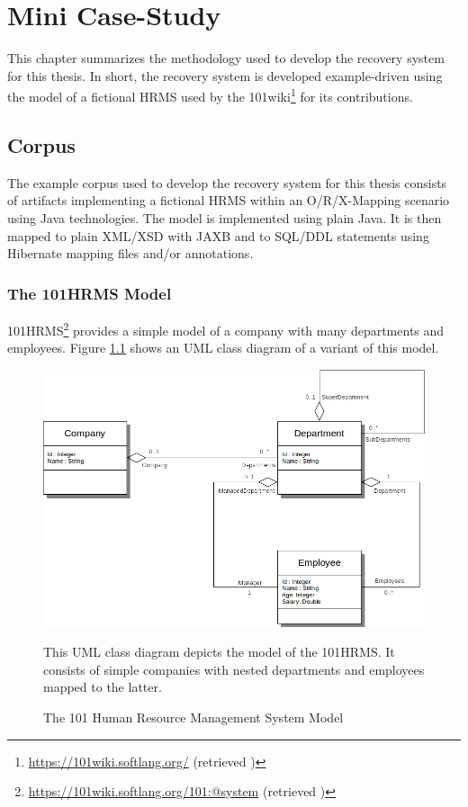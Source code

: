 \chapter{Mini Case-Study}
\label{chapter:MiniCaseStudy}
This chapter summarizes the methodology used to develop the recovery system for this thesis.
In short, the recovery system is developed example-driven using the model of a fictional \gls{HRMS} used by the 101wiki\footnote{\url{https://101wiki.softlang.org/} (retrieved )} for its contributions.

\section{Corpus}
\label{section:ExampleCorpus}
The example corpus used to develop the recovery system for this thesis consists of artifacts implementing a fictional \gls{HRMS} within an \gls{O/R/X-Mapping} scenario using \gls{Java} technologies.
The model is implemented using plain \Gls{Java}. 
It is then mapped to plain \gls{XML}/\gls{XSD} with \gls{JAXB} and to \gls{SQL/DDL} statements using \gls{Hibernate} mapping files and/or annotations.



\subsection{The 101HRMS Model}
\gls{101HRMS}\footnote{\url{https://101wiki.softlang.org/101:@system} (retrieved )} provides a simple model of a company with many departments and employees.
Figure \ref{figure:101HRMSModel} shows an \gls{UML} class diagram of a variant of this model.

\begin{figure}[h!]
\begin{center}
\includegraphics[scale=.5]{images/101HRMSModel.png}
\end{center}
{
\scriptsize 
This \gls{UML} class diagram depicts the model of the \gls{101HRMS}.
It consists of simple companies with nested departments and employees mapped to the latter.
}
\caption{The 101 Human Resource Management System Model}
\label{figure:101HRMSModel}
\end{figure}

